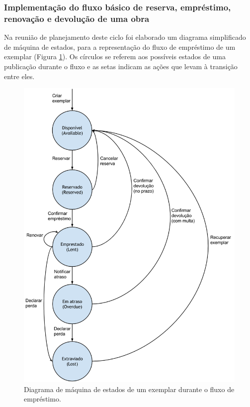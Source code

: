 \documentclass[a4paper]{article}
\begin{document}
\subsubsection{Implementação do fluxo básico de reserva, empréstimo, renovação e devolução de uma obra} \label{sssec:stransaction}
Na reunião de planejamento deste ciclo foi elaborado um diagrama simplificado de máquina de estados, para a representação do fluxo de empréstimo de um exemplar (Figura \ref{workflow}). Os círculos se referem aos possíveis estados de uma publicação durante o fluxo e as setas indicam as ações que levam à transição entre eles.

\begin{figure}[pbth!]
\centering
\includegraphics[width=140mm]{img/workflow.png}
\caption{Diagrama de máquina de estados de um exemplar durante o fluxo de empréstimo.\label{workflow}}
\end{figure}
\end{document}
